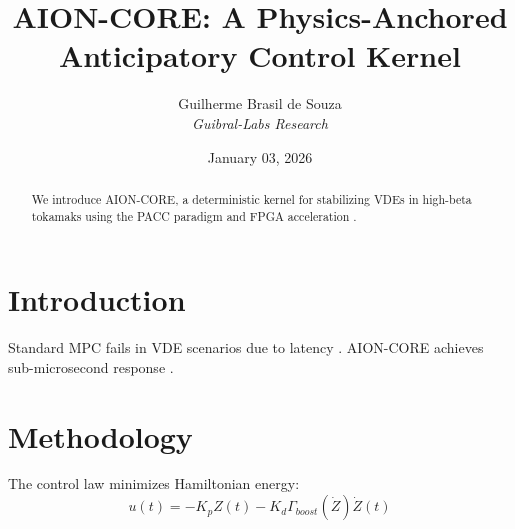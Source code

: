 \documentclass[10pt, twocolumn, a4paper]{article}
\title{\textbf{AION-CORE: A Physics-Anchored Anticipatory Control Kernel}}
\author{Guilherme Brasil de Souza \\ \textit{Guibral-Labs Research}}
\date{January 03, 2026}
\begin{document}
\maketitle
\begin{abstract}
We introduce AION-CORE, a deterministic kernel for stabilizing VDEs in high-beta tokamaks using the PACC paradigm and FPGA acceleration \cite{AION_CORE_2026}.
\end{abstract}
\section{Introduction}
Standard MPC fails in VDE scenarios due to latency \cite{bemporad2007mpc}. AION-CORE achieves sub-microsecond response \cite{wesson2011tokamaks}.
\section{Methodology}
The control law minimizes Hamiltonian energy:
\begin{equation} u(t) = - K_p Z(t) - K_d \Gamma_{boost}(\dot{Z}) \dot{Z}(t) \end{equation}


\end{document}
